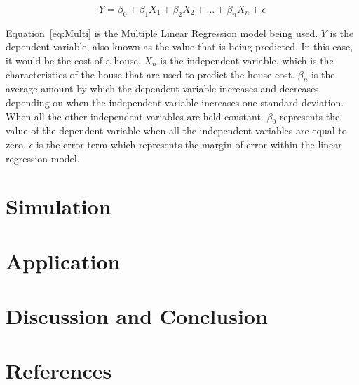 \documentclass[12pt]{article}
\begin{document}
\begin{equation}
  \label{eq:Multi}
  Y = \beta_{0} + \beta_{1}X_{1} + \beta_{2}X_{2} + ... + \beta_{n}X_{n} + \epsilon
\end{equation}

Equation~\ref{eq:Multi} is the Multiple Linear Regression model being used. \(Y\) is the dependent variable, also known as the value that is being predicted. In this case, it would be the cost of a house. \(X_{n}\) is the independent variable, which is the characteristics of the house that are used to predict the house cost. \(\beta_{n}\) is the average amount by which the dependent variable increases and decreases depending on when the independent variable increases one standard deviation. When all the other independent variables are held constant. \(\beta_{0}\) represents the value of the dependent variable when all the independent variables are equal to zero. \(\epsilon\) is the error term which represents the margin of error within the linear regression model. 

\section{Simulation}
\label{sec:sim}


\section{Application}
\label{sec:app}


\section{Discussion and Conclusion}
\label{sec:disc}



\section{References}
\label{sec:refer}



\cite{singh2021machlearn}
\cite{alfiyantin2017regress}



\end{document}
